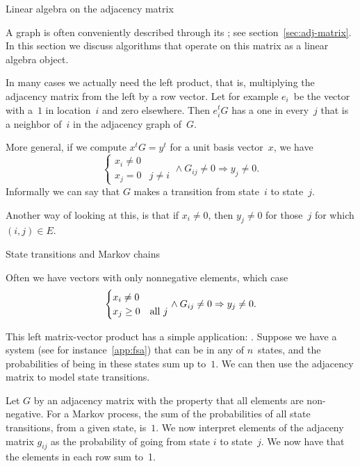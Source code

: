 
 {Linear algebra on the adjacency matrix}
\label{sec:adj-algebra}

A graph is often conveniently described through its
; see section~\ref{sec:adj-matrix}.
In this section we discuss algorithms that operate on this
matrix as a linear algebra object.

In many cases we actually need the left product, that is, multiplying
the adjacency matrix from the left by a row vector. Let for example $e_i$~be 
the vector with a~$1$ in location~$i$ and zero elsewhere. Then $e_i^tG$
has a one in every~$j$ that is a neighbor of~$i$ in the adjacency graph of~$G$.

More general, if we compute $x^tG=y^t$ for a unit basis vector~$x$, we have
\[ 
\begin{cases} x_i\not=0 \\ x_j=0&j\not= i \end{cases}
\wedge G_{ij}\not=0 \Rightarrow y_j\not=0.
\]
Informally we can say that $G$ makes a transition from state~$i$ to state~$j$.

Another way of looking at this, is that
if $x_i\not=0$, then $y_j\not=0$ for those~$j$
for which $(i,j)\in E$.

 {State transitions and Markov chains}
\label{sec:markov-matrix}

Often we have vectors with only nonnegative elements, which case
\[ 
\begin{cases} x_i\not=0 \\ x_j\geq 0&\hbox{all $j$} \end{cases}
\wedge G_{ij}\not=0 \Rightarrow y_j\not=0.
\]

This left matrix-vector product has a simple application: .
Suppose we have a system (see for instance~\ref{app:fsa}) that can be
in any of $n$~states, and the probabilities of being in these states sum up to~$1$.
We can then use the adjacency matrix to model
state transitions.

Let $G$ by an adjacency matrix with the property that all elements are
non-negative.
For a Markov process,
the sum of the probabilities of all state transitions,
from a given state, is~$1$.
We now interpret elements of the adjaceny matrix
$g_{ij}$ as the probability of going from state $i$ to state~$j$.
We now have that the elements in each row sum to~1.

